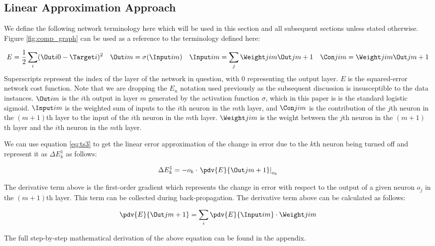 \subsection{Linear Approximation Approach}

We define the following network terminology here which will be used in this section and all subsequent sections  unless stated otherwise. Figure \ref{fig:comp_graph} can be used as a reference to the terminology defined here:

\begin{align}
E &= \frac{1}{2}\sum\limits_i (\Out i 0 - \Target i)^2 &
\Out i m &= \sigma(\Input i m) &
\Input i m &= \sum\limits_j {\Weight j i m}{ \Out j {m + 1}} &
\Con j i m = \Weight j i m \Out j {m+1}\label{eq:term}
\end{align}
Superscripts represent the index of the layer of the network in question, with 0 representing the output layer. $E$ is the squared-error network cost function. Note that we are dropping the $E_n$ notation used previously as the subsequent discussion is insusceptible to the data instances. $\Out i m$ is the $i$th output in layer $m$ generated by the activation function $\sigma$, which in this paper is is the standard logistic sigmoid. $\Input i m$ is the weighted sum of inputs to the $i$th neuron in the $m$th layer, and $\Con j i m$ is the contribution of the $j$th neuron in the $(m+1)$th layer to the input of the $i$th neuron in the $m$th layer. $\Weight j i m$ is the weight between the $j$th neuron in the $(m+1)$th layer and the $i$th neuron in the $m$th layer.

We can use equation \ref{eq:ts3} to get the linear error approximation of the change in error due to the $k$th neuron being turned off and represent it as $\Delta E_{k}^1$ as follows:

\begin{align}
\Delta E_{k}^1 = - o_k\cdot \left.\pdv{E}{{\Out j {m+1}}}\right|_{o_k}
\end{align}

The derivative term above is the first-order gradient which represents the change in error with respect to the output of a given neuron $o_j$ in the $(m+1)$th layer. This term can be collected during back-propagation. The derivative term above can be calculated as follows:

\begin{align}
\pdv{E}{{\Out j {m+1}}} = \sum\limits_i \pdv{E}{\Input i m}\cdot \Weight j i m
\end{align}

The full step-by-step mathematical derivation of the above equation can be found in the appendix.